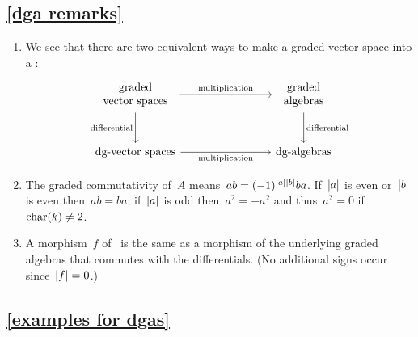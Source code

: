 \subsection{\cref{dga remarks}}
\label{dga remarks proof}

\leavevmode
\begin{enumerate}
  \item
    We see that there are two equivalent ways to make a graded vector space into a {\dga}:
    \[
      \begin{tikzcd}[column sep = 8em, row sep = large]
        \begin{tabular}{c} graded \\ vector spaces \end{tabular}
        \arrow{r}[above]{\text{multiplication}}
        \arrow{d}[left]{\text{differential}}
        &
        \begin{tabular}{c} graded \\ algebras \end{tabular}
        \arrow{d}[right]{\text{differential}}
        \\
        \text{\dgvs}
        \arrow{r}[below]{\text{multiplication}}
        &
        \text{\dgas}
      \end{tikzcd}
    \]
  \item
    The graded commutativity of~$A$ means~$ab = (-1)^{\lvert a\rvert \lvert b\rvert} ba$.
    If~$\lvert a\rvert$ is even or~$\lvert b\rvert$ is even then~$ab = ba$;
    if~$\lvert a\rvert$ is odd then~$a^2 = -a^2$ and thus~$a^2 = 0$ if~$\operatorname{char}(k) \neq 2$.
  \item
    A morphism~$f$ of~{\dgas} is the same as a morphism of the underlying graded algebras that commutes with the differentials.
    (No additional signs occur since~$\lvert f\rvert = 0$.)
\end{enumerate}


\subsection{\cref{examples for dgas}}
\label{examples for dgas proof}

